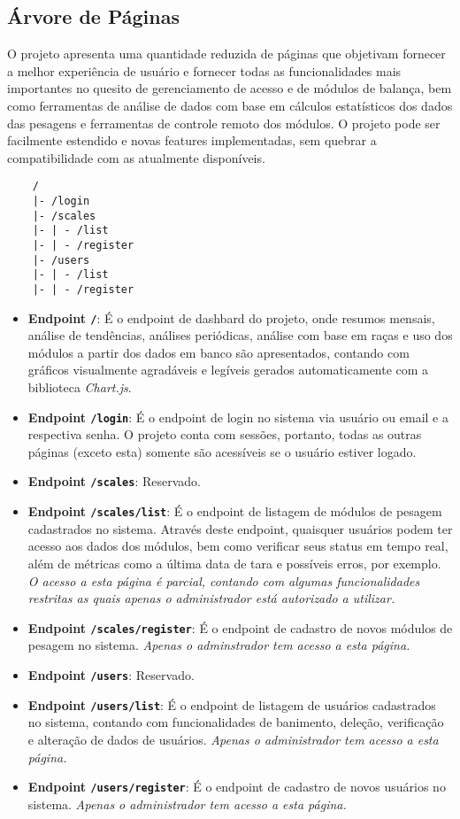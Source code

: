 \documentclass[11pt]{article}
\begin{document}
\subsection{Árvore de Páginas}

O projeto apresenta uma quantidade reduzida de páginas que objetivam fornecer a melhor experiência de usuário e fornecer todas as funcionalidades mais importantes no quesito de gerenciamento de acesso e de módulos de balança, bem como ferramentas de análise de dados com base em cálculos estatísticos dos dados das pesagens e ferramentas de controle remoto dos módulos. O projeto pode ser facilmente estendido e novas features implementadas, sem quebrar a compatibilidade com as atualmente disponíveis.

\begin{verbatim}
    /
    |- /login
    |- /scales
    |- | - /list
    |- | - /register
    |- /users
    |- | - /list
    |- | - /register

\end{verbatim}

\begin{itemize}
    \item \textbf{Endpoint \texttt{/}}: É o endpoint de dashbard do projeto, onde resumos mensais, análise de tendências, análises periódicas, análise com base em raças e uso dos módulos a partir dos dados em banco são apresentados, contando com gráficos visualmente agradáveis e legíveis gerados automaticamente com a biblioteca \textit{Chart.js}.
    \item \textbf{Endpoint \texttt{/login}}: É o endpoint de login no sistema via usuário ou email e a respectiva senha. O projeto conta com sessões, portanto, todas as outras páginas (exceto esta) somente são acessíveis se o usuário estiver logado.
    \item \textbf{Endpoint \texttt{/scales}}: Reservado.
    \item \textbf{Endpoint \texttt{/scales/list}}: É o endpoint de listagem de módulos de pesagem cadastrados no sistema. Através deste endpoint, quaisquer usuários podem ter acesso aos dados dos módulos, bem como verificar seus status em tempo real, além de métricas como a última data de tara e possíveis erros, por exemplo. \textit{O acesso a esta página é parcial, contando com algumas funcionalidades restritas as quais apenas o administrador está autorizado a utilizar.}
     \item \textbf{Endpoint \texttt{/scales/register}}: É o endpoint de cadastro de novos módulos de pesagem no sistema. \textit{Apenas o adminstrador tem acesso a esta página.}
     \item \textbf{Endpoint \texttt{/users}}: Reservado.
     \item \textbf{Endpoint \texttt{/users/list}}: É o endpoint de listagem de usuários cadastrados no sistema, contando com funcionalidades de banimento, deleção, verificação e alteração de dados de usuários. \textit{Apenas o administrador tem acesso a esta página.}
     \item \textbf{Endpoint \texttt{/users/register}}: É o endpoint de cadastro de novos usuários no sistema. \textit{Apenas o administrador tem acesso a esta página.}
\end{itemize}
\end{document}
